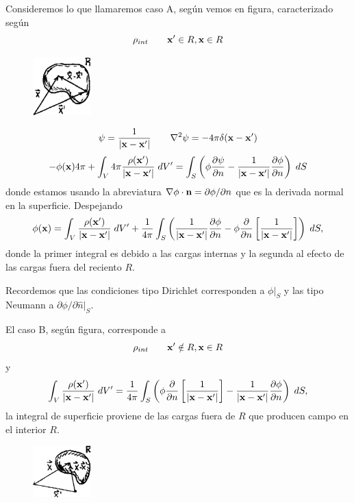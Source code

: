 \documentclass[10pt,oneside]{CBFT_book}
\begin{document}
Consideremos lo que llamaremos caso A, según vemos en figura, caracterizado según
\[
	\rho_{int} \qquad \vb{x}'\in R, \vb{x}\in R
\]
\begin{figure}[htb]
	\begin{center}
	\includegraphics[width=0.2\textwidth]{images/fig_ft1_imagegreen2.pdf}	 
	\end{center}
	\caption{}
\end{figure} 
\[
	\psi = \frac{1}{|\vb{x}-\vb{x}'|} \qquad \lapm{\psi} = -4\pi \delta(\vb{x}-\vb{x}')
\]
\[
	-\phi(\vb{x})4\pi + \int_V 4\pi \frac{\rho(\vb{x}')}{|\vb{x}-\vb{x}'|} \; dV' =
	\int_S \left( \phi\dpar{\psi}{n}-\frac{1}{|\vb{x}-\vb{x}'|}\dpar{\phi}{n}\right)\; dS 
\]
donde estamos usando la abreviatura $\Nabla\phi\cdot\vb{n}=\partial\phi/\partial n$ que es la
derivada normal en la superficie. Despejando
\[
	\phi(\vb{x}) = \int_V \frac{\rho(\vb{x}')}{|\vb{x}-\vb{x}'|} \; dV' +
	\frac{1}{4\pi} \int_S \left( \frac{1}{|\vb{x}-\vb{x}'|}\dpar{\phi}{n} -\phi\frac{\partial}{\partial 
n} \left[\frac{1}{|\vb{x}-\vb{x}'|} \right] \right)\; dS ,
\]
donde la primer integral es debido a las cargas internas y la segunda al efecto de las cargas
fuera del reciento $R$.

Recordemos que las condiciones tipo Dirichlet corresponden a $\phi|_S$ y las tipo Neumann a
$\partial\phi/\partial \hat{n}|_S$.

El caso B, según figura, corresponde a
\[
	\rho_{int} \qquad \vb{x}'\notin R, \vb{x}\in R
\]
y 
\[
	\int_V \frac{\rho(\vb{x}')}{|\vb{x}-\vb{x}'|} \; dV' = 
	\frac{1}{4\pi} \int_S \left( \phi\frac{\partial}{\partial n} \left[\frac{1}{|\vb{x}-\vb{x}'|} \right]
	- \frac{1}{|\vb{x}-\vb{x}'|}\dpar{\phi}{n}  \right)\; dS ,
\]
la integral de superficie proviene de las cargas fuera de $R$ que producen campo en el interior
$R$.

\begin{figure}[htb]
	\begin{center}
	\includegraphics[width=0.2\textwidth]{images/fig_ft1_imagegreen3.pdf}	 
	\end{center}
	\caption{}
\end{figure} 
\end{document}
